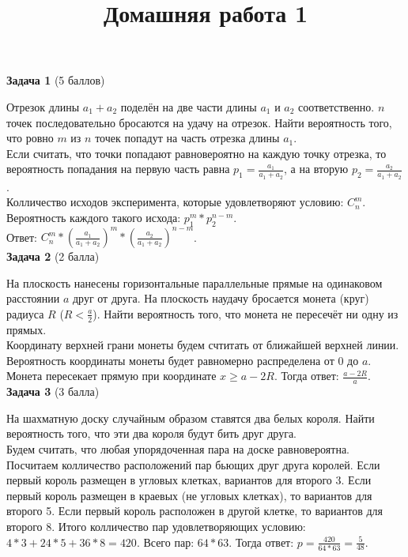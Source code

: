 \documentclass{article}
\title{Домашняя работа 1}
\begin{document}
\maketitle
\textbf{Задача 1} (5 баллов)

Отрезок длины $a_1 + a_2$ поделён на две части длины $a_1$ и $a_2$ соответственно. $n$ точек последовательно бросаются на удачу на отрезок. Найти вероятность того, что ровно $m$ из $n$ точек попадут на часть отрезка длины $a_1$.\\

Если считать, что точки попадают равновероятно на каждую точку отрезка, то вероятность попадания на первую часть равна $p_1 = \frac{a_1}{a_1 + a_2}$, а на вторую $p_2 = \frac{a_2}{a_1 + a_2}$.\\
Колличество исходов эксперимента, которые удовлетворяют условию: $C_n^m$. Вероятность каждого такого исхода: $p_1^m*p_2^{n-m}$.\\
Ответ: $C_n^m*(\frac{a_1}{a_1 + a_2})^m*(\frac{a_2}{a_1 + a_2})^{n-m}$.\\

\textbf{Задача 2} (2 балла)

На плоскость нанесены горизонтальные параллельные прямые на одинаковом расстоянии $a$ друг от друга. На плоскость наудачу бросается монета (круг) радиуса $R$ ($R < \frac{a}{2}$). Найти вероятность того, что монета не пересечёт ни одну из прямых.\\

Координату верхней грани монеты будем счтитать от ближайшей верхней линии. Вероятность координаты монеты будет равномерно распределена от $0$ до $a$. Монета пересекает прямую при координате $x \geq a - 2R$.
Тогда ответ: $\frac{a - 2R}{a}$.\\

\textbf{Задача 3} (3 балла)

На шахматную доску случайным образом ставятся два белых короля. Найти вероятность того, что эти два короля будут бить друг друга.\\

Будем считать, что любая упорядоченная пара на доске равновероятна. Посчитаем колличество расположений пар бьющих друг друга королей. Если первый король размещен в угловых клетках, вариантов для второго 3. Если первый король размещен в краевых (не угловых клетках), то вариантов для второго 5. Если первый король расположен в другой клетке, то вариантов для второго 8. Итого колличество пар удовлетворяющих условию: $4*3 + 24*5 + 36*8 = 420$. Всего пар: $64*63$. Тогда ответ: $p = \frac{420}{64*63} = \frac{5}{48}$.\\
\end{document}
